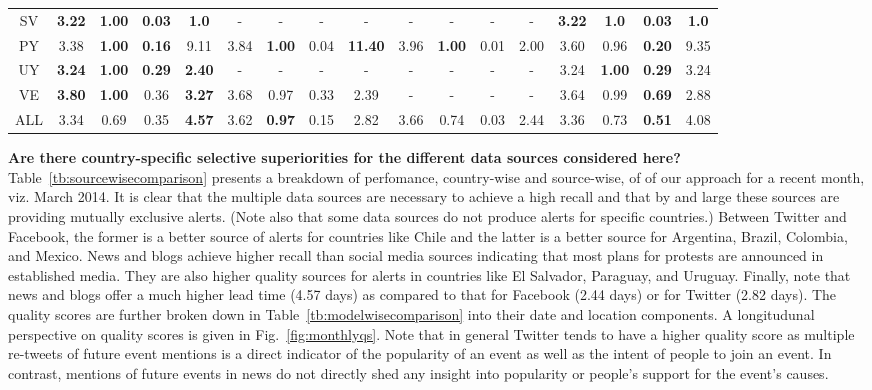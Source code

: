 \begin{table*}[tb!]
\begin{tabular}{|*{17}{c|}}
        SV &{\bf3.22}&{\bf1.00}&{\bf0.03}&{\bf1.0}&-&-&-&-&-&-&-&-&{\bf3.22}&{\bf1.0}&{\bf0.03}&{\bf1.0}\\
        PY &3.38&{\bf1.00}&{\bf0.16}&9.11&3.84&{\bf1.00}&0.04&{\bf11.40}&3.96&{\bf1.00}&0.01&2.00&3.60&0.96&{\bf0.20}&9.35\\
        UY &{\bf3.24}&{\bf1.00}&{\bf0.29}&{\bf2.40}&-&-&-&-&-&-&-&-&3.24&{\bf1.00}&{\bf0.29}&3.24\\
        VE &{\bf3.80}&{\bf1.00}&0.36&{\bf3.27}&3.68&0.97&0.33&2.39&-&-&-&-&3.64&0.99&{\bf0.69}&2.88\\
        ALL &3.34&0.69&0.35&{\bf4.57}&3.62&{\bf0.97}&0.15&2.82&3.66&0.74&0.03&2.44&3.36&0.73&{\bf0.51}&4.08\\
        \hline
    \end{tabular}
\end{table*}

\noindent
{\bf Are there country-specific selective superiorities for the different data sources considered here?}
Table~\ref{tb:sourcewisecomparison} presents a breakdown of perfomance, country-wise and source-wise, of 
of our approach for a recent month, viz. March 2014.
It is clear that the multiple data sources are necessary to achieve a high recall and that by and large
these sources are providing mutually exclusive alerts. (Note also that some data sources do not produce alerts for specific
countries.) Between Twitter and Facebook, the former is a better
source of alerts for countries like Chile and the latter is a better source for Argentina, Brazil, Colombia, and Mexico.
News and blogs achieve higher recall than social media sources indicating that most plans for protests are announced
in established media. They are also
higher quality sources for alerts in countries like El Salvador, Paraguay, and Uruguay.
Finally, note that news and blogs offer a much higher lead time (4.57 days) 
as compared to that for Facebook (2.44 days) or for Twitter (2.82 days). The quality scores are
further broken down in Table~\ref{tb:modelwisecomparison} into their date and location components.
A longitudunal perspective on quality scores is
given in Fig.~\ref{fig:monthlyqs}. Note that in general Twitter tends to have a higher quality score
as multiple re-tweets of future event mentions is a direct indicator of the popularity of an event as 
well as the intent of people to join an event. 
In contrast, mentions of future events in news do not directly shed any insight into popularity or people's
support for the event's causes.\\

